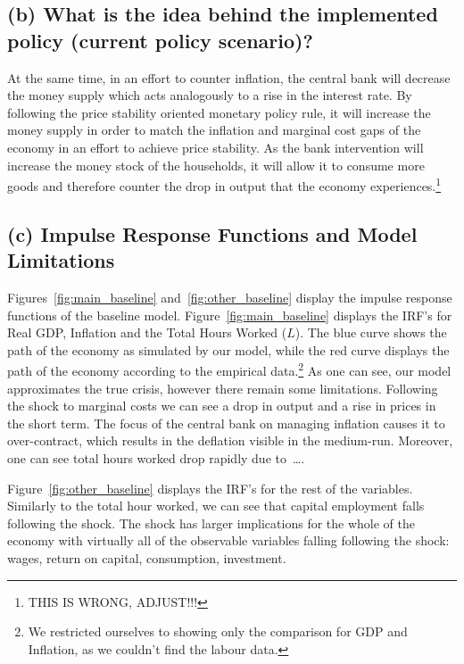 \documentclass[12pt]{article}
\begin{document}
\subsection*{(b) What is the idea behind the implemented policy (current policy scenario)?}

At the same time, in an effort to counter inflation, the central bank will decrease the money supply which acts analogously to a rise in the interest rate. By following the price stability oriented monetary policy rule, it will increase the money supply in order to match the inflation and marginal cost gaps of the economy in an effort to achieve price stability. As the bank intervention will increase the money stock of the households, it will allow it to consume more goods and therefore counter the drop in output that the economy experiences.\footnote{THIS IS WRONG, ADJUST!!!}

\subsection*{(c) Impulse Response Functions and Model Limitations}

Figures~\ref{fig:main_baseline} and~\ref{fig:other_baseline} display the impulse response functions of the baseline model. Figure~\ref{fig:main_baseline} displays the IRF's for Real GDP, Inflation and the Total Hours Worked ($L$). The blue curve shows the path of the economy as simulated by our model, while the red curve displays the path of the economy according to the empirical data.\footnote{We restricted ourselves to showing only the comparison for GDP and Inflation, as we couldn't find the labour data.} As one can see, our model approximates the true crisis, however there remain some limitations. Following the shock to marginal costs we can see a drop in output and a rise in prices in the short term. The focus of the central bank on managing inflation causes it to over-contract, which results in the deflation visible in the medium-run. Moreover, one can see total hours worked drop rapidly due to\ \dots. 

Figure~\ref{fig:other_baseline} displays the IRF's for the rest of the variables. Similarly to the total hour worked, we can see that capital employment falls following the shock. The shock has larger implications for the whole of the economy with virtually all of the observable variables falling following the shock: wages, return on capital, consumption, investment. 
\end{document}
